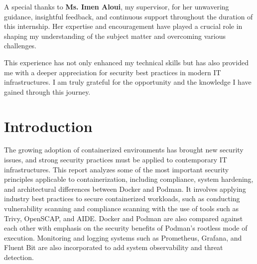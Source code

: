 \documentclass[12pt,a4paper]{report}
\begin{document}
A special thanks to \textbf{Ms. Imen Aloui}, my supervisor, for her unwavering guidance, insightful feedback, and continuous support throughout the duration of this internship. Her expertise and encouragement have played a crucial role in shaping my understanding of the subject matter and overcoming various challenges.

This experience has not only enhanced my technical skills but has also provided me with a deeper appreciation for security best practices in modern IT infrastructures. I am truly grateful for the opportunity and the knowledge I have gained through this journey.

\thispagestyle{empty} %

\newpage
\pagestyle{fancy} %


\pagestyle{empty} %
\renewcommand{\headrulewidth}{0pt} %
\tableofcontents
\thispagestyle{empty} %



\newpage

\fancypagestyle{noheaderplain}{
    \fancyhf{} %
    \fancyfoot[R]{\thepage} %
    \renewcommand{\headrulewidth}{0pt} %
}

\newpage
\pagestyle{fancy} %
\renewcommand{\headrulewidth}{0.4pt} %
\fancyfoot[R]{\thepage} %
\setcounter{page}{1}

\chapter*{Introduction}
\thispagestyle{noheaderplain} %




The growing adoption of containerized environments has brought new security issues, and strong security practices must be applied to contemporary IT infrastructures. This report analyzes some of the most important security principles applicable to containerization, including compliance, system hardening, and architectural differences between Docker and Podman. It involves applying industry best practices to secure containerized workloads, such as conducting vulnerability scanning and compliance scanning with the use of tools such as Trivy, OpenSCAP, and AIDE. Docker and Podman are also compared against each other with emphasis on the security benefits of Podman's rootless mode of execution. Monitoring and logging systems such as Prometheus, Grafana, and Fluent Bit are also incorporated to add system observability and threat detection.
\end{document}
